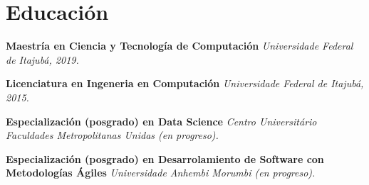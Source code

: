 \documentclass[espanol]{cv-style}          %
\begin{document}

\section{Educación}
\vspace{-0.3cm}
\begin{entrylist}
\entry
{}
{\textbf{Maestría en Ciencia y Tecnología de Computación}}
{}
{\textit{ Universidade Federal de Itajubá, 2019.}}
{}

\entry
{}
{\textbf{ Licenciatura en Ingeneria en Computación }}
{}
{\textit{ Universidade Federal de Itajubá, 2015.}}
{}

\entry
{}
{\textbf{Especialización (posgrado) en Data Science}}
{}
{\textit{Centro Universitário Faculdades Metropolitanas Unidas (en progreso).}}
{}

\entry
{}
{\textbf{Especialización (posgrado)  en Desarrolamiento de Software con Metodologías Ágiles}}
{}
{\textit{Universidade Anhembi Morumbi (en progreso).}}
{}

\end{entrylist}
{\vspace{-0.8cm}}
\end{document}
